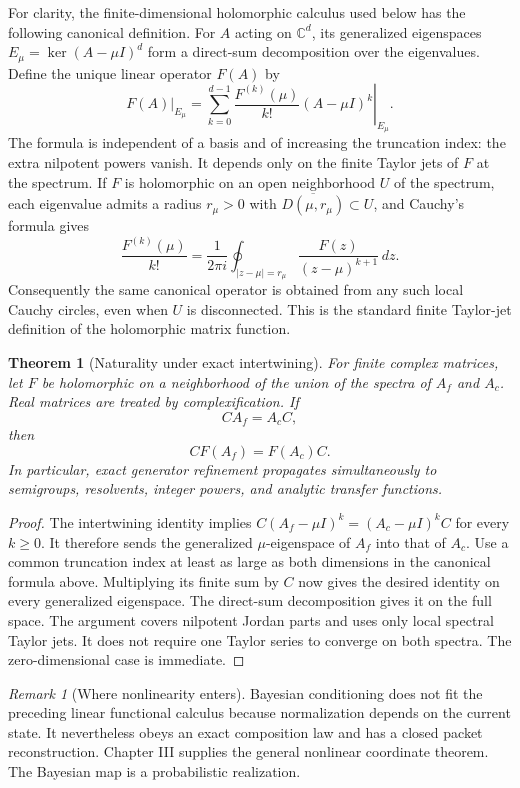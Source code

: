 \documentclass[11pt,letterpaper]{article}
\newtheorem{theorem}{Theorem}[section]
\theoremstyle{plain}
\theoremstyle{plain}
\theoremstyle{plain}
\theoremstyle{definition}
\theoremstyle{definition}
\theoremstyle{definition}
\theoremstyle{definition}
\theoremstyle{definition}
\theoremstyle{remark}
\theoremstyle{remark}
\newtheorem{remark}[remark]{Remark}
\theoremstyle{remark}
\theoremstyle{remark}
\theoremstyle{remark}
\theoremstyle{remark}
\let\KomorebiPrimitivemathbb\mathbb
\renewcommand{\mathbb}[1]{{\KomorebiPrimitivemathbb{#1}}}
\begin{document}
For clarity, the finite-dimensional holomorphic calculus used below has the
following canonical definition. For $A$ acting on $\mathbb C^d$, its generalized
eigenspaces $E_\mu=\ker(A-\mu I)^d$ form a direct-sum decomposition over the
eigenvalues. Define the unique linear operator $F(A)$ by
\[
\left.F(A)\right|_{E_\mu}
=\left.\sum_{k=0}^{d-1}\frac{F^{(k)}(\mu)}{k!}(A-\mu I)^k\right|_{E_\mu}.
\]
The formula is independent of a basis and of increasing the truncation index:
the extra nilpotent powers vanish. It depends only on the finite Taylor jets of
$F$ at the spectrum. If $F$ is holomorphic on an open neighborhood $U$ of the
spectrum, each eigenvalue admits a radius $r_\mu>0$ with
$\overline{D(\mu,r_\mu)}\subset U$, and Cauchy's formula gives
\[
\frac{F^{(k)}(\mu)}{k!}
=\frac{1}{2\pi i}\oint_{|z-\mu|=r_\mu}
  \frac{F(z)}{(z-\mu)^{k+1}}\,dz.
\]
Consequently the same canonical operator is obtained from any such local
Cauchy circles, even when $U$ is disconnected. This is the standard finite
Taylor-jet definition of the holomorphic matrix function.

\begin{theorem}[Naturality under exact intertwining]\label{core:record:044}
For finite complex matrices, let $F$ be holomorphic on a neighborhood of the union of the spectra of $A_f$ and $A_c$. Real matrices are treated by complexification. If
\[
CA_f=A_cC,
\]
then
\[
\boxed{CF(A_f)=F(A_c)C.}
\]
In particular, exact generator refinement propagates simultaneously to semigroups, resolvents, integer powers, and analytic transfer functions.
\end{theorem}

\begin{proof}
The intertwining identity implies
$C(A_f-\mu I)^k=(A_c-\mu I)^kC$ for every $k\ge0$.
It therefore sends the generalized $\mu$-eigenspace of $A_f$ into that of $A_c$.
Use a common truncation index at least as large as both dimensions in the
canonical formula above. Multiplying its finite sum by $C$ now gives the desired
identity on every generalized eigenspace. The direct-sum decomposition gives
it on the full space. The argument covers nilpotent Jordan parts and uses only
local spectral Taylor jets. It does not require one Taylor series to converge
on both spectra. The zero-dimensional case is immediate.
\end{proof}

\begin{remark}[Where nonlinearity enters]\label{core:record:045}
Bayesian conditioning does not fit the preceding linear functional calculus because normalization depends on the current state. It nevertheless obeys an exact composition law and has a closed packet reconstruction. Chapter III supplies the general nonlinear coordinate theorem. The Bayesian map is a probabilistic realization.
\end{remark}
\end{document}
